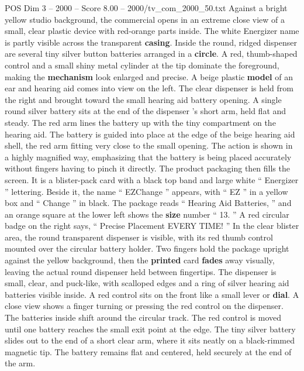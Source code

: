 \begin{textsample}{POS Dim 3 – 2000 – Score 8.00 – 2000/tv\_com\_2000\_50.txt}  \label{ex:f3_pos_062}
Against a bright yellow studio background, the commercial opens in an extreme close view of a small, clear plastic device with red-orange parts inside.
The white Energizer name is partly visible across the transparent \textbf{casing}.
Inside the round, ridged dispenser are several tiny silver button batteries arranged in a \textbf{circle}.
A red, thumb-shaped control and a small shiny metal cylinder at the tip dominate the foreground, making the \textbf{mechanism} look enlarged and precise.
A beige plastic \textbf{model} of an ear and hearing aid comes into view on the left.
The clear dispenser is held from the right and brought toward the small hearing aid battery opening.
A single round silver battery sits at the end of the dispenser ’s short arm, held flat and steady.
The red arm lines the battery up with the tiny compartment on the hearing aid.
The battery is guided into place at the edge of the beige hearing aid shell, the red arm fitting very close to the small opening.
The action is shown in a highly magnified way, emphasizing that the battery is being placed accurately without fingers having to pinch it directly.
The product packaging then fills the screen.
It is a blister-pack card with a black top band and large white “ Energizer ” lettering.
Beside it, the name “ EZChange ” appears, with “ EZ ” in a yellow box and “ Change ” in black.
The package reads “ Hearing Aid Batteries, ” and an orange square at the lower left shows the \textbf{size} number “ 13. ” A red circular badge on the right says, “ Precise Placement EVERY TIME! ” In the clear blister area, the round transparent dispenser is visible, with its red thumb control mounted over the circular battery holder.
Two fingers hold the package upright against the yellow background, then the \textbf{printed} card \textbf{fades} away visually, leaving the actual round dispenser held between fingertips.
The dispenser is small, clear, and puck-like, with scalloped edges and a ring of silver hearing aid batteries visible inside.
A red control sits on the front like a small lever or \textbf{dial}.
A close view shows a finger turning or pressing the red control on the dispenser.
The batteries inside shift around the circular track.
The red control is moved until one battery reaches the small exit point at the edge.
The tiny silver battery slides out to the end of a short clear arm, where it sits neatly on a black-rimmed magnetic tip.
The battery remains flat and centered, held securely at the end of the arm.

\end{textsample}
